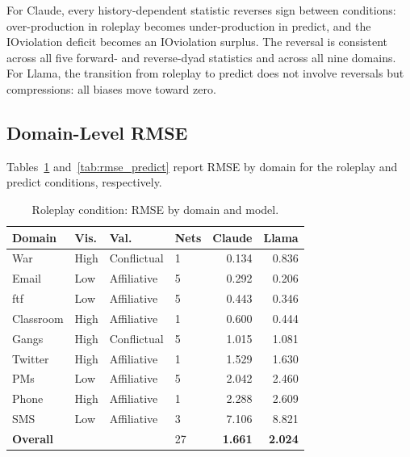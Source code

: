 \documentclass[11pt]{article}
\begin{document}
For Claude, every history-dependent statistic reverses sign between
conditions: over-production in roleplay becomes under-production in
predict, and the IOviolation deficit becomes an IOviolation surplus.
The reversal is consistent across all five forward- and reverse-dyad
statistics and across all nine domains. For Llama, the transition from
roleplay to predict does not involve reversals but compressions: all
biases move toward zero.

\subsection{Domain-Level RMSE}

Tables~\ref{tab:rmse_roleplay} and~\ref{tab:rmse_predict} report RMSE
by domain for the roleplay and predict conditions, respectively.

\begin{table}[H]
\centering
\caption{Roleplay condition: RMSE by domain and model.}
\label{tab:rmse_roleplay}
\begin{tabular}{llllrr}
\toprule
\textbf{Domain} & \textbf{Vis.} & \textbf{Val.} &
\textbf{Nets} & \textbf{Claude} & \textbf{Llama} \\
\midrule
War       & High & Conflictual & 1 & 0.134 & 0.836 \\
Email     & Low  & Affiliative & 5 & 0.292 & 0.206 \\
ftf       & Low  & Affiliative & 5 & 0.443 & 0.346 \\
Classroom & High & Affiliative & 1 & 0.600 & 0.444 \\
Gangs     & High & Conflictual & 5 & 1.015 & 1.081 \\
Twitter   & High & Affiliative & 1 & 1.529 & 1.630 \\
PMs       & Low  & Affiliative & 5 & 2.042 & 2.460 \\
Phone     & High & Affiliative & 1 & 2.288 & 2.609 \\
SMS       & Low  & Affiliative & 3 & 7.106 & 8.821 \\
\midrule
\textbf{Overall} & & & 27 & \textbf{1.661} & \textbf{2.024} \\
\bottomrule
\end{tabular}
\end{table}
\end{document}
